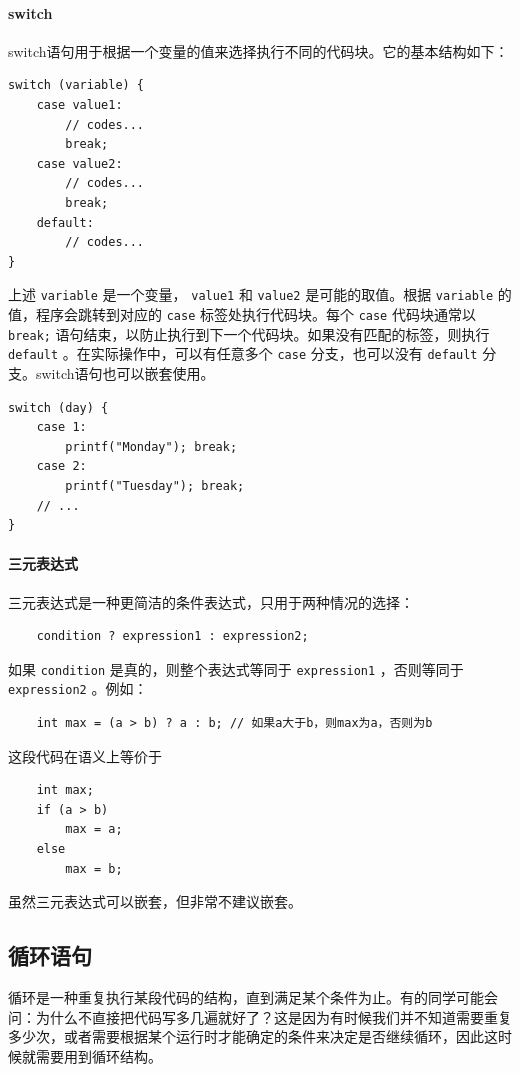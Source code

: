 \paragraph{switch} switch语句用于根据一个变量的值来选择执行不同的代码块。它的基本结构如下：
\begin{verbatim}
switch (variable) {
    case value1:
        // codes...
        break;
    case value2:
        // codes...
        break;
    default:
        // codes...
}
\end{verbatim}
上述 \verb|variable| 是一个变量， \verb|value1| 和 \verb|value2| 是可能的取值。根据 \verb|variable| 的值，程序会跳转到对应的 \verb|case| 标签处执行代码块。每个 \verb|case| 代码块通常以 \verb|break;| 语句结束，以防止执行到下一个代码块。如果没有匹配的标签，则执行 \verb|default| 。在实际操作中，可以有任意多个 \verb|case| 分支，也可以没有 \verb|default| 分支。switch语句也可以嵌套使用。
\begin{verbatim}
switch (day) {
    case 1:
        printf("Monday"); break;
    case 2:
        printf("Tuesday"); break;
    // ...
}
\end{verbatim}

\paragraph{三元表达式} 三元表达式是一种更简洁的条件表达式，只用于两种情况的选择：
\begin{verbatim}
    condition ? expression1 : expression2;
\end{verbatim}
如果 \verb|condition| 是真的，则整个表达式等同于 \verb|expression1| ，否则等同于 \verb|expression2| 。例如：
\begin{verbatim}
    int max = (a > b) ? a : b; // 如果a大于b，则max为a，否则为b
\end{verbatim}
这段代码在语义上等价于
\begin{verbatim}
    int max;
    if (a > b) 
        max = a;
    else 
        max = b;
\end{verbatim}
虽然三元表达式可以嵌套，但非常不建议嵌套。

\subsection{循环语句}

循环是一种重复执行某段代码的结构，直到满足某个条件为止。有的同学可能会问：为什么不直接把代码写多几遍就好了？这是因为有时候我们并不知道需要重复多少次，或者需要根据某个运行时才能确定的条件来决定是否继续循环，因此这时候就需要用到循环结构。

